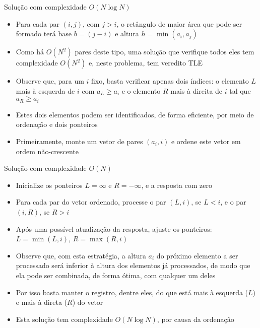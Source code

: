 \begin{frame}[fragile]{Solução com complexidade $O(N\log N)$}

    \begin{itemize}
        \item Para cada par $(i, j)$, com $j > i$, o retângulo de maior área que pode ser
            formado terá base $b = (j - i)$ e altura $h = \min(a_i, a_j)$

        \item Como há $O(N^2)$ pares deste tipo, uma solução que verifique todos eles tem
            complexidade $O(N^2)$ e, neste problema, tem veredito TLE

        \item Observe que, para um $i$ fixo, basta verificar apenas dois índices: o elemento $L$
            mais à esquerda de $i$ com $a_L \geq a_i$ e o elemento $R$ mais à direita de $i$ tal
            que $a_R\geq a_i$

        \item Estes dois elementos podem ser identificados, de forma eficiente, por meio de
            ordenação e dois ponteiros

        \item Primeiramente, monte um vetor de pares $(a_i, i)$ e ordene este vetor em ordem
            não-crescente
   \end{itemize}

\end{frame}

\begin{frame}[fragile]{Solução com complexidade $O(N)$}

    \begin{itemize}
        \item Inicialize os ponteiros $L = \infty$ e $R = -\infty$, e a resposta com zero

        \item Para cada par do vetor ordenado, processe o par $(L, i)$, se $L < i$, e o par
            $(i, R)$, se $R > i$

        \item Após uma possível atualização da resposta, ajuste os ponteiros: $L = \min(L, i)$,
            $R = \max(R, i)$

        \item Observe que, com esta estratégia, a altura $a_i$ do próximo elemento a ser processado
            será inferior à altura dos elementos já processados, de modo que ela pode ser 
            combinada, de forma ótima, com qualquer um deles
        
        \item Por isso basta manter o registro, dentre eles, do que está mais à esquerda ($L$)
            e mais à direta ($R$) do vetor

        \item Esta solução tem complexidade $O(N\log N)$, por causa da ordenação
    \end{itemize}

\end{frame}

